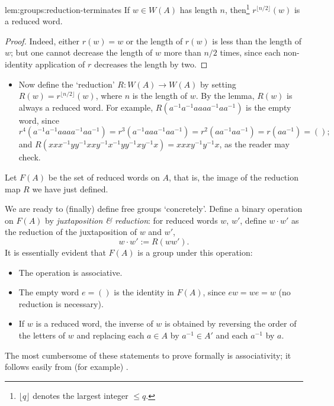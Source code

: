 \begin{lem}{}{lem:groups:reduction-terminates}
  If $w \in W(A)$ has length $n$,
    then\footnote{$\lfloor q \rfloor$ denotes the largest integer
      $\leq q$.} $r^{\lfloor n/2 \rfloor} (w)$ is a reduced
    word.
\end{lem}
\begin{proof}
  Indeed, either $r(w) = w$ or the length of $r(w)$ is less than the
  length of $w$; but one cannot decrease the length of $w$ more than
  $n/2$ times, since each non-identity application of $r$ decreases
  the length by two.
\end{proof}

\begin{itemize}
\item Now define the `reduction' $R : W(A) \to W(A)$ by setting
  $R(w) = r^{\lfloor n/2 \rfloor}(w)$, where $n$ is the length of
  $w$. By the lemma, $R(w)$ is always a reduced word. For example,
  $R(a^{-1}a^{-1}aaaa^{-1}aa^{-1})$ is the empty word, since
  \[
    r^4(a^{-1}a^{-1}aaaa^{-1}aa^{-1}) = r^3(a^{-1}aaa^{-1}aa^{-1}) =
    r^2(aa^{-1}aa^{-1}) = r(aa^{-1}) = ();
  \]
  and
  $R(xxx^{-1}yy^{-1}xxy^{-1}x^{-1}yy^{-1}xy^{-1}x) =
  xxxy^{-1}y^{-1}x$, as the reader may check.
\end{itemize}

Let $F(A)$ be the set of reduced words on $A$, that is, the image of
the reduction map $R$ we have just defined.

We are ready to (finally) define free groups `concretely'. Define a
binary operation on $F(A)$ by \emph{juxtaposition \& reduction}: for
reduced words $w$, $w'$, define $w \cdot w'$ as the reduction of the
juxtaposition of $w$ and $w'$,
\[
  w \cdot w' := R(ww').
\]
It is essentially evident that $F(A)$ is a group under this operation:
\begin{itemize}
\item The operation is associative.
\item The empty word $e = ()$ is the identity in $F(A)$, since
  $ew = we = w$ (no reduction is necessary).
\item If $w$ is a reduced word, the inverse of $w$ is obtained by
  reversing the order of the letters of $w$ and replacing each
  $a \in A$ by $a^{-1} \in A'$ and each $a^{-1}$ by $a$.
\end{itemize}
The most cumbersome of these statements to prove formally is
associativity; it follows easily from (for example)
.


